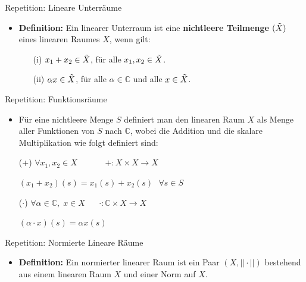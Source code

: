 \documentclass[14pt, aspectratio=169, handout]{beamer}
\begin{document}
\begin{frame}{Repetition: Lineare Unterräume}
    \begin{itemize}
        \item \textbf{Definition:} Ein linearer Unterraum ist eine \textbf{nichtleere Teilmenge} $(\Tilde{X})$ eines linearen Raumes $X$, wenn gilt:
        \item[] 
    \item[] \begin{itemize}
                \item[(i)] $x_1 + x_2 \in \Tilde{X}$, für alle $x_1, x_2 \in \Tilde{X}$.
                \item[] 
                \item[(ii)] $\alpha x \in \Tilde{X}$, für alle $\alpha \in \mathbb{C}$ und alle $x\in \Tilde{X}$.
            \end{itemize}
    \end{itemize}
\end{frame}

\begin{frame}{Repetition: Funktionsräume}

\begin{itemize}
    \item Für eine nichtleere Menge $S$ definiert man den linearen Raum $X$ als Menge aller Funktionen von $S$ nach $\mathbb{C}$, wobei die Addition und die skalare Multiplikation wie folgt definiert sind:
    \item[] 
    \item[(+)] $\forall x_1, x_2 \in X \hspace{40pt} +:X \times X \to X \hspace{12pt} $
    \item[] $(x_1 + x_2)(s) = x_1(s) + x_2(s) \hspace{8pt} \forall s \in S$
    \item[] 
    \item[($\cdot$)] $\forall \alpha \in \mathbb{C}, \; x \in X \hspace{20pt} \cdot : \mathbb{C} \times X \to X \hspace{14pt} $
    \item[] $(\alpha \cdot x)(s) = \alpha x(s)$
\end{itemize}
\end{frame}

\begin{frame}{Repetition: Normierte Lineare Räume}
    \begin{itemize}
        \item \textbf{Definition:} Ein normierter linearer Raum ist ein Paar $(X, ||\cdot||)$ bestehend aus einem linearen Raum $X$ und einer Norm auf $X$.
    \end{itemize}
\end{frame}
\end{document}

